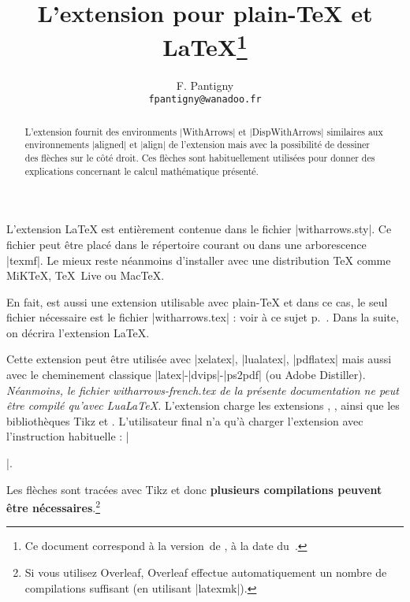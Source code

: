 \documentclass[dvipsnames]{article}%
\begin{document}
\VerbatimFootnotes

\title{L'extension  pour plain-TeX et LaTeX\thanks{Ce document correspond à la 
version~\myfileversion\space de , à la date du~\myfiledate.}} 
\author{F. Pantigny \\ \texttt{fpantigny@wanadoo.fr}}  

\maketitle


\begin{abstract}
L'extension  fournit des environments |{WithArrows}| et |{DispWithArrows}|
similaires aux environnements |{aligned}| et |{align}| de l'extension  mais
avec la possibilité de dessiner des flèches sur le côté droit. Ces flèches sont
habituellement utilisées pour donner des explications concernant le calcul mathématique
présenté.
\end{abstract}


\vspace{1cm} L'extension LaTeX  est entièrement contenue dans le fichier
|witharrows.sty|. Ce fichier peut être placé dans le répertoire courant ou dans une
arborescence |texmf|. Le mieux reste néanmoins d'installer  avec une
distribution TeX comme MiKTeX, TeX~Live ou MacTeX.

\medskip
En fait,  est aussi une extension utilisable avec plain-TeX et dans ce
cas, le seul fichier nécessaire est le fichier |witharrows.tex| : voir à ce sujet
p.~\pageref{plain-TeX}. Dans la suite, on décrira l'extension LaTeX.

\medskip
Cette extension peut être utilisée avec |xelatex|, |lualatex|, |pdflatex| mais aussi avec
le cheminement classique |latex|-|dvips|-|ps2pdf| (ou Adobe Distiller). \textsl{Néanmoins,
  le fichier witharrows-french.tex de la présente documentation ne peut être compilé
  qu'avec LuaLaTeX.} L'extension  charge les extensions ,
,  ainsi que les bibliothèques Tikz  et
. L'utilisateur final n'a qu'à charger l'extension  avec
l'instruction habituelle : |\usepackage{witharrows}|.

\medskip
Les flèches sont tracées avec Tikz et donc \textbf{plusieurs compilations peuvent être
  nécessaires}.\footnote{Si vous utilisez Overleaf, Overleaf effectue automatiquement un
  nombre de compilations suffisant (en utilisant |latexmk|).}
\end{document}
